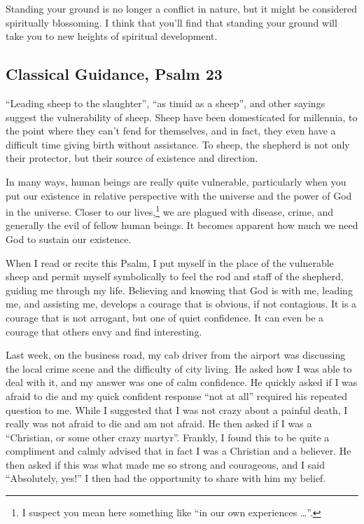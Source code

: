 \documentclass[12pt]{memoir}
\begin{document}
Standing your ground is no longer a conflict in nature, but it might be considered spiritually blossoming. I think that you'll find that standing your ground will take you to new heights
of spiritual development.

\subsection[Classical Guidance]{Classical Guidance, Psalm 23}

``Leading sheep to the slaughter'', ``as timid as a sheep'', and other sayings suggest the vulnerability of sheep. Sheep have
been domesticated for millennia, to the point where they can't fend
for themselves, and in fact, they even have a difficult time giving
birth without assistance. To sheep, the shepherd is not only their protector, but their source of existence and direction.

In many ways, human beings are really quite vulnerable, particularly
when you put our existence in relative perspective with the universe
and the power of God in the universe. Closer to our lives,\footnote{I suspect you mean here something like ``in our own experiences \dots''.} we
are plagued with disease, crime, and generally the evil of fellow
human beings. It becomes apparent how much we need God to sustain
our existence.

When I read or recite this Psalm, I put myself in the place of the
vulnerable sheep and permit myself symbolically to feel the rod and
staff of the shepherd, guiding me through my life. Believing and knowing
that God is with me, leading me, and assisting me, develops a courage
that is obvious, if not contagious. It is a courage that is not arrogant,
but one of quiet confidence. It can even be a courage that others envy and find interesting.

Last week, on the business road, my cab driver from the airport was
discussing the local crime scene and the difficulty of city living.
He asked how I was able to deal with it, and my answer was one of
calm confidence. He quickly asked if I was afraid to die and my quick
confident response ``not at all'' required his repeated question
to me. While I suggested that I was not crazy about a painful death,
I really was not afraid to die and am not afraid. He then asked if
I was a ``Christian, or some other crazy martyr''. Frankly, I found
this to be quite a compliment and calmly advised that in fact I was
a Christian and a believer. He then asked if this was what made me
so strong and courageous, and I said ``Absolutely, yes!'' I then
had the opportunity to share with him my belief.
\end{document}
